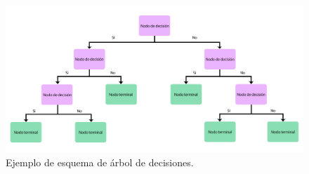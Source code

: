 \begin{figure}[h]
    \centering
    \includegraphics[width=\linewidth]{archivos/arb_des}
    \caption{Ejemplo de esquema de árbol de decisiones.}
    \label{fig:arbol}
\end{figure}

